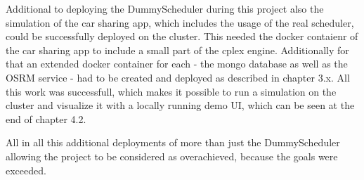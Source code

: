 Additional to deploying the DummyScheduler during this project also the simulation of the car sharing app, which includes the usage of the real scheduler, could be successfully deployed on the cluster. This needed the docker contaienr of the car sharing app to include a small part of the cplex engine. Additionally for that an extended docker container for each - the mongo database as well as the OSRM service - had to be created and deployed as described in chapter 3.x. All this work was successfull, which makes it possible to run a simulation on the cluster and visualize it with a locally running demo UI, which can be seen at the end of chapter 4.2.

All in all this additional deployments of more than just the DummyScheduler allowing the project to be considered as overachieved, because the goals were exceeded.